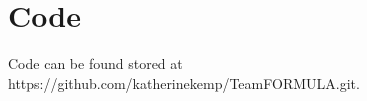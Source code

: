 \appendix
\renewcommand{\thechapter}{B}
\renewcommand{\chaptername}{Appendix}

\chapter{Code}
\label{sec: appB}

Code can be found stored at \\
https://github.com/katherinekemp/TeamFORMULA.git.